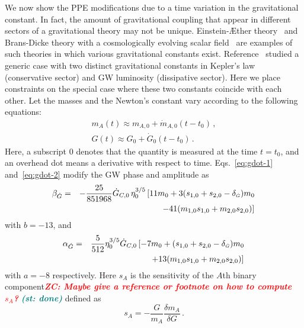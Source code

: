 \documentclass[prd,twocolumn,nofootinbib]{revtex4-1}
\newcommand\be{\begin{equation}}
\newcommand\ee{\end{equation}}
\newcommand{\Gdot}{{\mbox{\tiny $\dot G$}}}
\newcommand{\shammi}[1]{\textcolor{teal}{\it{\textbf{(st: #1)}}} }
\newcommand{\zc}[1]{\textcolor{red}{\it{\textbf{ZC: #1}}} }
\begin{document}
We now show the PPE modifications due to a time variation in the gravitational constant. In fact, the amount of gravitational coupling that appear in different sectors of a  gravitational theory may not be unique. Einstein-\AE ther theory~\cite{Yagi:2013ava} and Brans-Dicke theory with a cosmologically evolving scalar field~\cite{Will2006} are examples of such theories in which various gravitational constants exist. Reference~\cite{Tahura:2018zuq} studied a generic case with two distinct gravitational constants in Kepler's law (conservative sector) and GW luminosity (dissipative sector). Here we place constraints on the special case where these two constants coincide with each other. Let the masses and the Newton's constant vary according to the following equations:
 \begin{eqnarray}\label{eq:gdot-1}
 m_A(t)\approx m_{A,0}+\dot{m}_{A,0}(t-t_0)\,, \\\label{eq:gdot-2}
   \label{eq:3.7a4}  G(t)\approx  G_{0}+\dot{G}_{0}(t-t_0)\,.
 \end{eqnarray}
 Here, a subscript $0$ denotes that the quantity is measured at the time $t=t_0$, and an overhead dot means a derivative with respect to time. Eqs.~\eqref{eq:gdot-1} and~\eqref{eq:gdot-2} modify the GW phase and amplitude as~\cite{Tahura:2018zuq}
 \begin{eqnarray}\label{eq:beta_gdot}
 \beta_{\dot{G}}&=&-\frac{25}{851968}\dot{G}_{C,0}\,\eta_0^{3/5}\left[11m_0 +3(s_{1,0}+s_{2,0}-\delta_\Gdot)m_0 \right. \nonumber \\
 && \left. -41 (m_{1,0}s_{1,0}+m_{2,0}s_{2,0})\right]\,
  \end{eqnarray} 
with $b=-13$, and 
\begin{eqnarray}\label{eq:alpha_gdot}
\label{eq:3.7d2}
 \alpha_{\dot{G}}&=&\frac{5}{512}\eta_0^{3/5}\dot{G}_{C,0}\left[-7m_0+(s_{1,0}+s_{2,0}-\delta_\Gdot)m_0 \right. \nonumber \\
 && \left.+13 (m_{1,0}s_{1,0}+m_{2,0}s_{2,0})\right]\, 
 \end{eqnarray}
with $a=-8$ respectively. Here $s_A$ is the sensitivity of the $A$th binary component\zc{Maybe give a reference or footnote on how to compute $s_A$?} \shammi{done}defined as
\be
s_A=-\frac{G}{m_A}\frac{\delta m_A}{\delta  G}\,.
\ee
 
\end{document}
